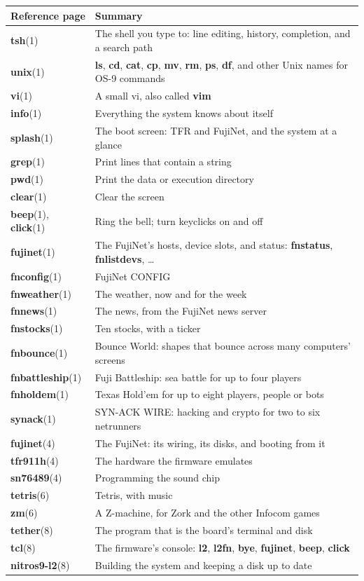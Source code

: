 \documentclass[10pt,twoside,openany]{book}
\newcommand{\cmd}[1]{\textbf{#1}}            %
\newcommand{\rp}[2]{\textbf{#1}(#2)}         %
\begin{document}
\begin{tabularx}{\linewidth}{@{}>{\raggedright\arraybackslash}p{1.25in}X@{}}
\toprule
\textbf{Reference page} & \textbf{Summary}\\
\midrule
\rp{tsh}{1} & The shell you type to: line editing, history, completion,
and a search path\\
\rp{unix}{1} & \cmd{ls}, \cmd{cd}, \cmd{cat}, \cmd{cp}, \cmd{mv}, \cmd{rm},
\cmd{ps}, \cmd{df}, and other Unix names for OS-9 commands\\
\rp{vi}{1} & A small vi, also called \cmd{vim}\\
\rp{info}{1} & Everything the system knows about itself\\
\rp{splash}{1} & The boot screen: TFR and FujiNet, and the system at a glance\\
\rp{grep}{1} & Print lines that contain a string\\
\rp{pwd}{1} & Print the data or execution directory\\
\rp{clear}{1} & Clear the screen\\
\rp{beep}{1}, \rp{click}{1} & Ring the bell; turn keyclicks on and off\\
\rp{fujinet}{1} & The FujiNet's hosts, device slots, and status: \cmd{fnstatus}, \cmd{fnlistdevs}, \ldots\\
\rp{fnconfig}{1} & FujiNet CONFIG\\
\rp{fnweather}{1} & The weather, now and for the week\\
\rp{fnnews}{1} & The news, from the FujiNet news server\\
\rp{fnstocks}{1} & Ten stocks, with a ticker\\
\rp{fnbounce}{1} & Bounce World: shapes that bounce across many computers' screens\\
\rp{fnbattleship}{1} & Fuji Battleship: sea battle for up to four players\\
\rp{fnholdem}{1} & Texas Hold'em for up to eight players, people or bots\\
\rp{synack}{1} & SYN-ACK WIRE: hacking and crypto for two to six netrunners\\
\rp{fujinet}{4} & The FujiNet: its wiring, its disks, and booting from it\\
\rp{tfr911h}{4} & The hardware the firmware emulates\\
\rp{sn76489}{4} & Programming the sound chip\\
\rp{tetris}{6} & Tetris, with music\\
\rp{zm}{6} & A Z-machine, for Zork and the other Infocom games\\
\rp{tether}{8} & The program that is the board's terminal and disk\\
\rp{tcl}{8} & The firmware's console: \cmd{l2}, \cmd{l2fn}, \cmd{bye}, \cmd{fujinet}, \cmd{beep}, \cmd{click}\\
\rp{nitros9-l2}{8} & Building the system and keeping a disk up to date\\
\bottomrule
\end{tabularx}
\end{document}

